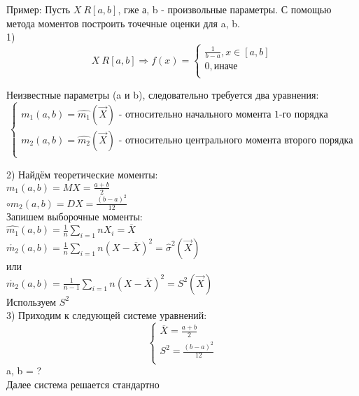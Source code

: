 Пример:
Пусть $X ~ R[a,b]$, гже а, b - произвольные параметры. С помощью метода моментов построить точечные оценки для a, b.\\
1)\\
\begin{equation}
X ~ R[a, b] \Rightarrow f(x) = 
\begin{cases}
\frac{1}{b - a}, x \in [a ,b]\\
0, \text{иначе}\\
\end{cases}
\end{equation}

Неизвестные параметры (a и b), следовательно требуется два уравнения:\\
\begin{equation}
\begin{cases}
m_{1}(a, b) = \hat{m_{1}}(\overrightarrow{X}) \text{ - относительно начального момента 1-го порядка}\\
m_{2}(a, b) = \hat{m_{2}}(\overrightarrow{X}) \text{ - относительно центрального момента второго порядка}\\
\end{cases}
\end{equation}

2) Найдём теоретические моменты:\\
$m_{1}(a,b) = MX = \frac{a + b}{2}$\\
$\circ{m_{2}}(a,b) = DX = \frac{(b - a)^{2}}{12}$\\

Запишем выборочные моменты:\\
$\hat{m_{1}}(a,b)=\frac{1}{n}\sum_{i=1}{n}X_{i} = \overline{X}$\\
$\mathring{m_{2}}(a,b) = \frac{1}{n}\sum_{i=1}{n}(X-\overline{X})^{2} = \hat{\sigma}^{2}(\overrightarrow{X})$\\
или\\
$\mathring{m_{2}}(a,b) = \frac{1}{n - 1}\sum_{i=1}{n}(X-\overline{X})^{2} = S^{2}(\overrightarrow{X})$\\

Используем $S^{2}$\\
3) Приходим к следующей системе уравнений:\\
\begin{equation}
\begin{cases}
\overline{X} = \frac{a + b}{2}\\
S^{2} = \frac{(b - a)^{2}}{12}\\
\end{cases}
\end{equation}
a, b = ?\\
Далее система решается стандартно\\

